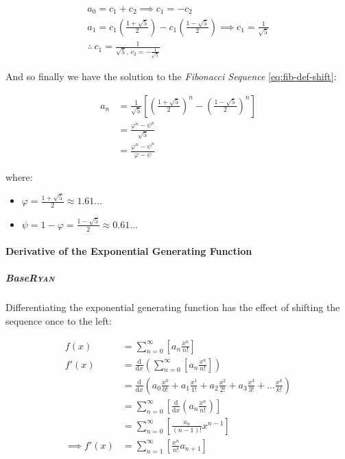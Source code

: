 \documentclass[a4paper,11pt,twoside]{article}
\begin{document}
\begin{align*}
a_0= c_1 +  c_2  \implies  c_1= - c_2\\
a_1= c_1 \left( \frac{1+ \sqrt{5} }{2} \right) -  c_1 \left( \frac{1-\sqrt{5} }{2} \right)  \implies  c_1 = \frac{1}{\sqrt{5} }\\
\therefore ~ c_1 = \frac{1}{\sqrt{5}, ~ c_2 = -\frac{1}{\sqrt{5}}}
\end{align*}


And so finally we have the solution to the \emph{Fibonacci Sequence} \ref{eq:fib-def-shift}:


\begin{align}
    a_n &= \frac{1}{\sqrt{5} } \left[ \left( \frac{1+  \sqrt{5} }{2}  \right)^n -  \left( \frac{1- \sqrt{5} }{2} \right)^n \right] \nonumber \\
&= \frac{\varphi^n - \psi^n}{\sqrt{5} } \nonumber\\
&=\frac{\varphi^n -  \psi^n}{\varphi - \psi} \label{eq:fib-sol}
\end{align}


where:

\begin{itemize}
\item \(\varphi = \frac{1+ \sqrt{5} }{2} \approx 1.61\ldots\)
\item \(\psi = 1-\varphi = \frac{1- \sqrt{5} }{2} \approx 0.61\ldots\)
\end{itemize}

\paragraph{Derivative of the Exponential Generating Function}
\label{Derivative-exp-gen-function}
\subparagraph{Base\hfill{}\textsc{Ryan}}
\label{sec:org9c5c5bf}
Differentiating the exponential generating function has the effect of shifting the sequence once to the left: \cite{lehmanReadingsMathematicsComputer2010}

\begin{align}
    f\left( x \right) &= \sum^{\infty}_{n= 0}   \left[ a_n \frac{x^n}{n!} \right] \label{eq:exp-pow-series} \\
f'\left( x \right) &= \frac{\mathrm{d} }{\mathrm{d} x}\left( \sum^{\infty}_{n= 0}   \left[ a_n \frac{x^n}{n!} \right]  \right) \nonumber \\
&= \frac{\mathrm{d}}{\mathrm{d} x} \left( a_0 \frac{x^0}{0!} +  a_1 \frac{x^1}{1!} +  a_2 \frac{x^2}{2!}+  a_3 \frac{x^3}{3! } +  \ldots \frac{x^k}{k!} \right) \nonumber \\
&= \sum^{\infty}_{n= 0}   \left[ \frac{\mathrm{d} }{\mathrm{d} x}\left( a_n \frac{x^n}{n!} \right) \right] \nonumber \\
&= \sum^{\infty}_{n= 0}   {\left[{ \frac{a_n}{{\left({ n- 1 }\right)!}} } x^{n- 1}  \right]} \nonumber \\
\implies f'(x) &= \sum^{\infty}_{n= 1}   {\left[{ \frac{x^n}{n!}a_{n+  1} }\right]} \label{eq:exp-pow-series-sol}
\end{align}
\end{document}
